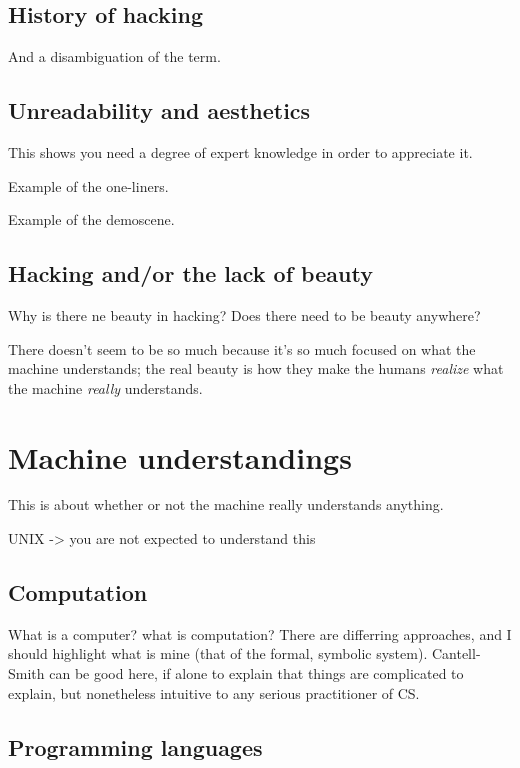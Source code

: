 \documentclass{article}
\begin{document}
\subsection{History of hacking}

And a disambiguation of the term.

\subsection{Unreadability and aesthetics}

This shows you need a degree of expert knowledge in order to appreciate it.

Example of the one-liners.

Example of the demoscene.

\subsection{Hacking and/or the lack of beauty}

Why is there ne beauty in hacking? Does there need to be beauty anywhere?

There doesn't seem to be so much because it's so much focused on what the machine understands; the real beauty is how they make the humans \emph{realize} what the machine \emph{really} understands.

\section{Machine understandings}

This is about whether or not the machine really understands anything.

UNIX -> you are not expected to understand this

\subsection{Computation}

What is a computer? what is computation? There are differring approaches, and I should highlight what is mine (that of the formal, symbolic system). Cantell-Smith can be good here, if alone to explain that things are complicated to explain, but nonetheless intuitive to any serious practitioner of CS.

\subsection{Programming languages}
\end{document}
